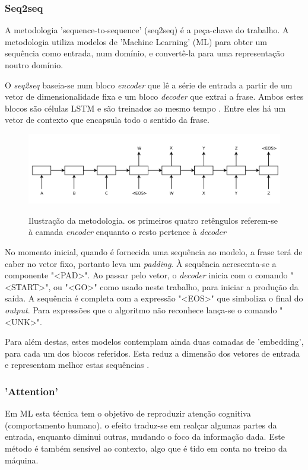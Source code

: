 \documentclass{article}
\begin{document}
\subsubsection{Seq2seq}
A metodologia 'sequence-to-sequence' (seq2seq) é a peça-chave do trabalho. A metodologia utiliza modelos de 'Machine Learning' (ML) para obter um sequência como entrada, num domínio, e convertê-la para uma representação noutro domínio. 

O \textit{seq2seq} baseia-se num bloco \textit{encoder} que lê a série de entrada a partir de um vetor de dimensionalidade fixa e um bloco \textit{decoder} que extrai a frase. Ambos estes blocos são células LSTM e são treinados ao mesmo tempo \cite{sutskever2014sequence}. Entre eles há um vetor de contexto que encapsula todo o sentido da frase.

\begin{figure}[h]
    \centering
    \includegraphics[scale=0.3]{encoder_decoder.png}
    \caption{Ilustração da metodologia. os primeiros quatro retêngulos referem-se à camada \textit{encoder} enquanto o resto pertence à \textit{decoder}}
    \cite{sutskever2014sequence}
    \label{fig1}
\end{figure}


No momento inicial, quando é fornecida uma sequência ao modelo, a frase terá de caber no vetor fixo, portanto leva um \textit{padding}. À sequência acrescenta-se a componente "\textless PAD\textgreater ". Ao passar pelo vetor, o \textit{decoder} inicia com o comando "\textless START\textgreater ", ou "\textless GO\textgreater " como usado neste trabalho, para iniciar a produção da saída. A sequência é completa com a expressão "\textless EOS\textgreater " que simboliza o final do \textit{output}. Para expressões que o algoritmo não reconhece lança-se o comando "\textless UNK\textgreater ".

Para além destas, estes modelos contemplam ainda duas camadas de 'embedding', para cada um dos blocos referidos. Esta reduz a dimensão dos vetores de entrada e representam melhor estas sequências \cite{li2018slim}. 

\subsubsection{'Attention'}
Em ML esta técnica tem o objetivo de reproduzir atenção cognitiva (comportamento humano). o efeito traduz-se em realçar algumas partes da entrada, enquanto diminui outras, mudando o foco da informação dada. Este método é também sensível ao contexto, algo que é tido em conta no treino da máquina. 
\end{document}
